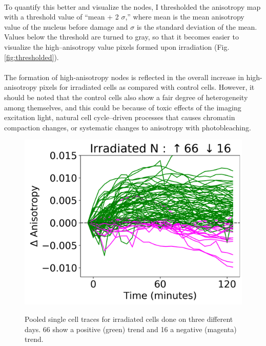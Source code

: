 \paragraph*{} To quantify this better and visualize the nodes, I thresholded the anisotropy map with a threshold value of “mean + 2 $\sigma$,” where mean is the mean anisotropy value of the nucleus before damage and $\sigma$ is the standard deviation of the mean. Values below the threshold are turned to gray, so that it becomes easier to visualize the high–anisotropy value pixels formed upon irradiation (Fig. {\ref{fig:thresholded}}). 

\paragraph*{} The formation of high-anisotropy nodes is reflected in the overall increase in high-anisotropy pixels for irradiated cells as compared with control cells. However, it should be noted that the control cells also show a fair degree of heterogeneity among themselves, and this could be because of toxic effects of the imaging excitation light, natural cell cycle–driven processes that causes chromatin compaction changes, or systematic changes to anisotropy with photobleaching. 


\begin{figure}[H]
    {\hfill\includegraphics[clip, width=0.8\linewidth]{figures/closely.png}\hspace*{\fill}}
    \caption{Pooled single cell traces for irradiated cells done on three different days. 66 show a positive (green) trend and 16 a negative (magenta) trend.}
    {\label{fig:closely}}
\end{figure}


